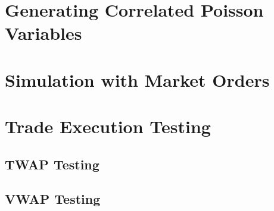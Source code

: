 \section{Generating Correlated Poisson Variables}
\begin{singlespacing}
\label{correlated-poisson}
\end{singlespacing}

\section{Simulation with Market Orders}
\begin{singlespacing}
\label{code:simulation}
\end{singlespacing}

\section{Trade Execution Testing}
\begin{singlespacing}
\subsection{TWAP Testing}
\label{code:twap_code}
\end{singlespacing}
\subsection{VWAP Testing}
\begin{singlespacing}
\label{code:vwap_code}
\end{singlespacing}